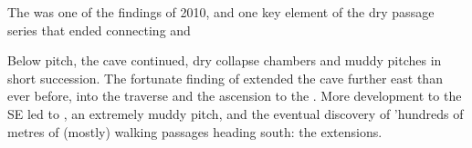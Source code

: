 \begin{marginfigure}
	\checkoddpage \ifoddpage \forcerectofloat \else \forceversofloat \fi
	\centering	{} 
  	\caption{The \protect{} was one of the findings of 2010, and one key element of the dry passage series that ended connecting \protect{} and \protect{} } \label{fig:minotaur_rift}
	\end{marginfigure}


Below  pitch, the cave continued, dry collapse chambers and muddy pitches in short succession. The fortunate finding of  extended the cave further east than ever before, into the  traverse and the ascension to the . More development to the SE led to , an extremely muddy pitch, and the eventual discovery of 'hundreds of metres of (mostly) walking passages heading south: the  extensions.


